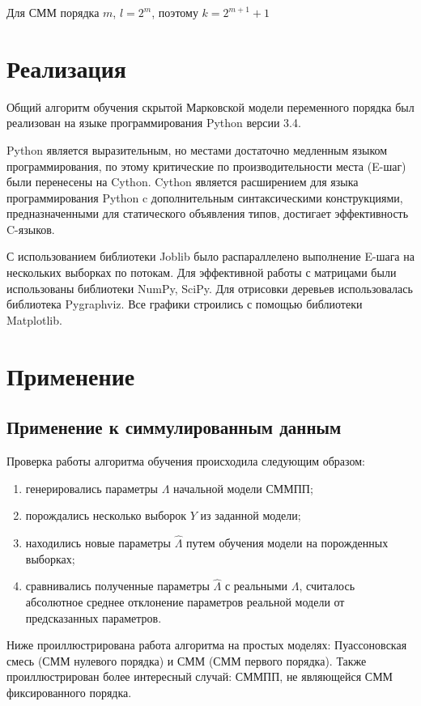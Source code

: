 \documentclass{matmex-diploma-custom}
\begin{document}
Для СММ порядка $m$, $l=2^m$, поэтому $k = 2^{m+1}+1$

\section{Реализация}
Общий алгоритм обучения скрытой Марковской модели переменного порядка был реализован на языке программирования Python версии 3.4.
 
Python является выразительным, но местами достаточно медленным языком программирования, по этому критические по производительности места (E-шаг) были перенесены на Cython. Cython является расширением для языка программирования Python c дополнительным синтаксическими конструкциями, предназначенными для статического объявления типов, достигает эффективность C-языков.

С использованием библиотеки Joblib было распараллелено выполнение E-шага на нескольких выборках по потокам. Для эффективной работы с матрицами были использованы библиотеки NumPy, SciPy. Для отрисовки деревьев использовалась библиотека Pygraphviz. Все графики строились с помощью библиотеки Matplotlib.


\section{Применение}
\subsection{Применение к симмулированным данным}
Проверка работы алгоритма обучения происходила следующим образом:
\begin{enumerate}
\item
генерировались параметры $\Lambda$ начальной модели СММПП;
\item
порождались несколько выборок $ Y $ из заданной модели;
\item
находились новые параметры $\hat{\Lambda}$ путем обучения модели на порожденных выборках;
\item
сравнивались полученные параметры $\hat{\Lambda}$ с реальными $\Lambda$,
считалось абсолютное среднее отклонение параметров реальной модели от предсказанных параметров. 
\end{enumerate}

Ниже проиллюстрирована работа алгоритма на простых моделях: Пуассоновская смесь (СММ нулевого порядка) и СММ (СММ первого порядка). Также проиллюстрирован более интересный случай: СММПП, не являющейся СММ фиксированного порядка.
\end{document}
